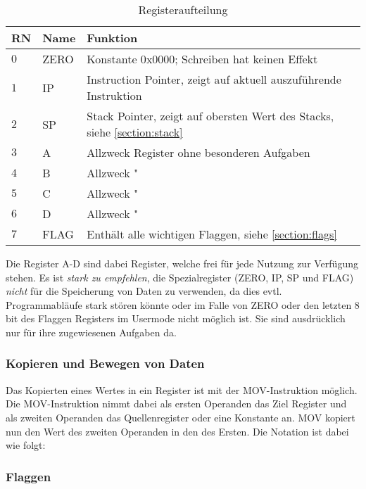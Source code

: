 \documentclass{scrartcl}
\begin{document}
\begin{center}
	\begin{table}[h]
		\caption{\label{table:register} Registeraufteilung}
		\begin{tabular}{l | l | l}
			RN & Name & Funktion\\
			\hline
			$0$ & ZERO & Konstante $0\text{x}0000$; Schreiben hat keinen Effekt\\
			$1$ & IP & Instruction Pointer, zeigt auf aktuell auszuführende Instruktion\\
			$2$ & SP & Stack Pointer, zeigt auf obersten Wert des Stacks, siehe \ref{section:stack} \\
			$3$ & A & Allzweck Register ohne besonderen Aufgaben \\
			$4$ & B & Allzweck " \\
			$5$ & C & Allzweck " \\
			$6$ & D & Allzweck " \\
			$7$ & FLAG & Enthält alle wichtigen Flaggen, siehe \autoref{section:flags} \\
		\end{tabular}
	\end{table}
\end{center}

Die Register A-D sind dabei Register, welche frei für jede Nutzung zur Verfügung stehen.
Es ist \emph{stark zu empfehlen}, die Spezialregister (ZERO, IP, SP und FLAG) \emph{nicht} für die Speicherung von Daten zu verwenden, da dies evtl. Programmabläufe stark stören könnte oder im Falle von ZERO oder den letzten 8 bit des Flaggen Registers im Usermode nicht möglich ist.
Sie sind ausdrücklich nur für ihre zugewiesenen Aufgaben da.

\subsubsection{\label{section:DataMov} Kopieren und Bewegen von Daten}

Das Kopierten eines Wertes in ein Register ist mit der MOV-Instruktion möglich.
Die MOV-Instruktion nimmt dabei als ersten Operanden das Ziel Register und als zweiten Operanden das Quellenregister oder eine Konstante an.
MOV kopiert nun den Wert des zweiten Operanden in den des Ersten.
Die Notation ist dabei wie folgt:




\subsubsection{\label{section:flags}Flaggen}
\end{document}
